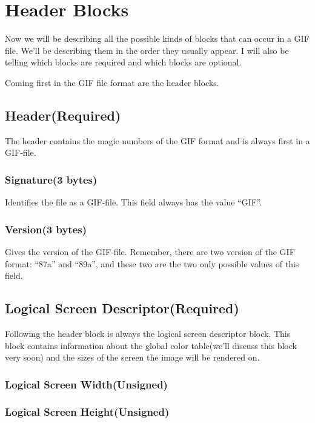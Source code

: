   \section{Header Blocks}

  Now we will be describing all the possible kinds of blocks that
  can occur in a GIF file. We'll be describing them in the order they
  usually appear. I will also be telling which blocks are required and
  which blocks are optional.

  Coming first in the GIF file format are the header blocks.

  \subsection{Header(Required)}

  The header contains the magic numbers of the GIF format and is always
  first in a GIF-file.

  \subsubsection*{Signature(3 bytes)}

  Identifies the file as a GIF-file. This field always has the value
  ``GIF''.

  \subsubsection{Version(3 bytes)}

  Gives the version of the GIF-file. Remember, there are two version
  of the GIF format: ``87a'' and ``89a'', and these two are the two
  only possible values of this field.

  \subsection{Logical Screen Descriptor(Required)}

  Following the header block is always the logical screen descriptor
  block. This block contains information about the global color
  table(we'll discuss this block very soon) and the sizes of the
  screen the image will be rendered on.

  \subsubsection{Logical Screen Width(Unsigned)}
  \subsubsection{Logical Screen Height(Unsigned)}

